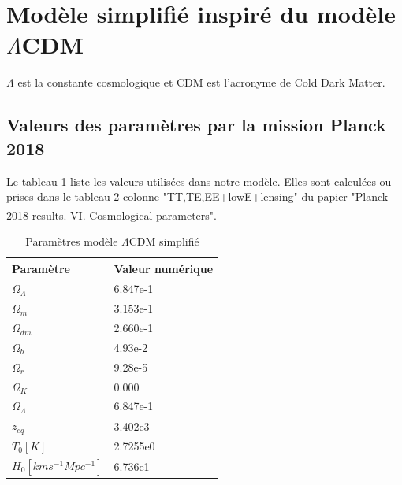 \documentclass[10pt, a4paper]{report}
\numberwithin{equation}{subsection}
\begin{document}
\makeatletter
\renewcommand\chapter{\thispagestyle{plain}%
\global\@topnum\z@
\@afterindentfalse
\secdef\@chapter\@schapter}
\makeatother 

\section{Modèle simplifié inspiré du modèle $\Lambda$CDM}
$\Lambda$ est la constante cosmologique et CDM est l'acronyme de Cold Dark Matter. 

\subsection{Valeurs des paramètres par la mission Planck 2018}
Le tableau \ref{tab:PI} liste les valeurs utilisées dans notre modèle. Elles sont calculées ou prises dans le tableau 2 colonne "TT,TE,EE+lowE+lensing" du papier "Planck 2018 results. VI. Cosmological parameters"\textsuperscript{\cite{Planck2018}}.
\begin{table}
\begin{center}
\begin{tabular}{ m{5cm} m{5cm} } 
 \hline
 Paramètre & Valeur numérique\\ 
 \hline
$\Omega_\Lambda$ & 6.847e-1\\ 
$\Omega_m$ & 3.153e-1\\ 
$\Omega_{dm}$ & 2.660e-1\\ 
$\Omega_b$ & 4.93e-2\\ 
$\Omega_r$ & 9.28e-5\\
$\Omega_K$ & 0.000\\
$\Omega_\Lambda$ & 6.847e-1\\ 
$z_{eq}$ & 3.402e3\\
$T_0 [K]$ & 2.7255e0\\ 
$H_0 [km s^{-1} Mpc^{-1}]$ & 6.736e1\\ 
 \hline

\end{tabular}
\end{center}
\caption{Paramètres modèle $\Lambda$CDM simplifié}
\label{tab:PI}
\end{table}
\end{document}
